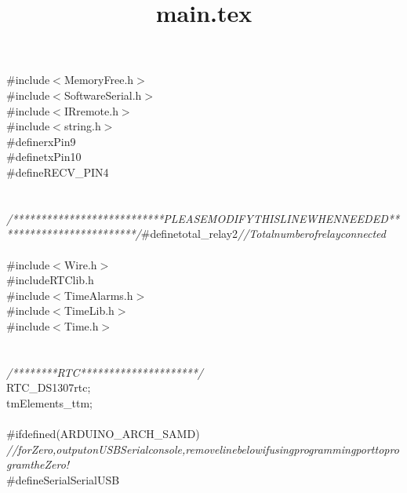 \documentclass[a4paper, 12pt]{article}
\title{main.tex}
\newcommand\SPC{\hspace*{0.6em}}
\newcommand\QOT{\mbox{\char 34}}
\newcommand{\CppAComment}[1]{\textit{\textcolor[rgb]{0.2,0.4,1}{#1}}}
\newcommand{\CppAIdentifier}[1]{\textcolor[rgb]{0,1,0}{#1}}
\newcommand{\CppAIllegalChar}[1]{\textcolor[rgb]{1,0,0}{\colorbox[rgb]{0.5,0,0}{#1}}}
\newcommand{\CppANumber}[1]{\textcolor[rgb]{0,0,1}{#1}}
\newcommand{\CppAPreprocessor}[1]{\textcolor[rgb]{0.2,0.8,0.8}{#1}}
\newcommand{\CppASpace}[1]{\textcolor[rgb]{1,1,1}{\colorbox[rgb]{0,0,0}{#1}}}
\newcommand{\CppASymbol}[1]{\textcolor[rgb]{1,0,0}{#1}}
\begin{document}
\begin{ttfamily}
\noindent
\CppAPreprocessor{\#include\SPC $<$MemoryFree.h$>$}\\
\CppAPreprocessor{\#include\SPC $<$SoftwareSerial.h$>$}\\
\CppAPreprocessor{\#include\SPC $<$IRremote.h$>$}\\
\CppAPreprocessor{\#include\SPC $<$string.h$>$}\\
\CppAPreprocessor{\#define\SPC rxPin\SPC 9}\\
\CppAPreprocessor{\#define\SPC txPin\SPC 10}\\
\CppAPreprocessor{\#define\SPC RECV\_PIN\SPC 4}\\
\\
\\
\CppAComment{/***************************PLEASE\SPC MODIFY\SPC THIS\SPC LINE\SPC WHEN\SPC NEEDED*************************/}\CppASpace{\SPC }\CppAIllegalChar{\#}\CppAIdentifier{define}\CppASpace{\SPC }\CppAIdentifier{total\_relay}\CppASpace{\SPC }\CppANumber{2}\CppASpace{\SPC \SPC \SPC \SPC }\CppAComment{//\SPC Total\SPC number\SPC of\SPC relay\SPC connected}\\
\\
\CppAPreprocessor{\#include\SPC $<$Wire.h$>$}\\
\CppAPreprocessor{\#include\SPC \QOT RTClib.h\QOT }\\
\CppAPreprocessor{\#include\SPC $<$TimeAlarms.h$>$}\\
\CppAPreprocessor{\#include\SPC $<$TimeLib.h$>$}\\
\CppAPreprocessor{\#include\SPC $<$Time.h$>$}\\
\\
\\
\CppAComment{/********RTC*********************/}\\
\CppAIdentifier{RTC\_DS1307}\CppASpace{\SPC }\CppAIdentifier{rtc}\CppASymbol{;}\\
\CppAIdentifier{tmElements\_t}\CppASpace{\SPC }\CppAIdentifier{tm}\CppASymbol{;}\\
\\
\CppAPreprocessor{\#if\SPC defined(ARDUINO\_ARCH\_SAMD)}\\
\CppAComment{//\SPC for\SPC Zero,\SPC output\SPC on\SPC USB\SPC Serial\SPC console,\SPC remove\SPC line\SPC below\SPC if\SPC using\SPC programming\SPC port\SPC to\SPC program\SPC the\SPC Zero!}\\
\CppASpace{\SPC \SPC \SPC }\CppAPreprocessor{\#define\SPC Serial\SPC SerialUSB}\\

\end{ttfamily}
\end{document}
